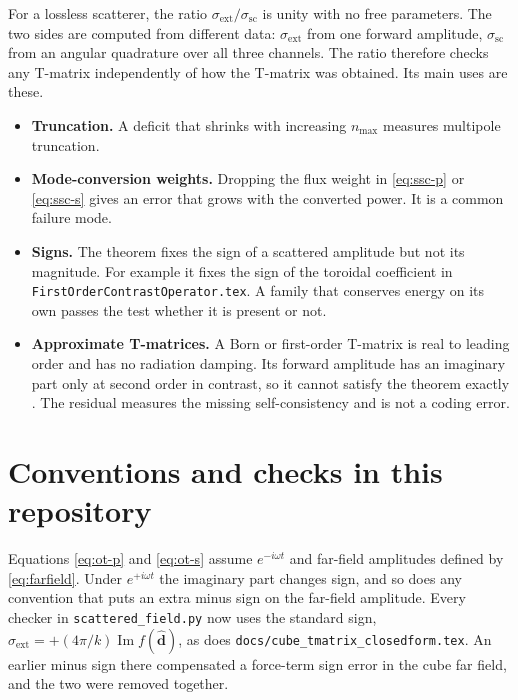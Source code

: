 \documentclass[11pt,a4paper]{article}
\newcommand{\bd}{\hat{\mathbf{d}}}
\newcommand{\sext}{\sigma_{\mathrm{ext}}}
\newcommand{\ssc}{\sigma_{\mathrm{sc}}}
\DeclareMathOperator{\Imag}{Im}
\begin{document}
For a lossless scatterer, the ratio $\sext/\ssc$ is unity with no free
parameters. The two sides are computed from different data: $\sext$
from one forward amplitude, $\ssc$ from an angular quadrature over all
three channels. The ratio therefore checks any T-matrix independently
of how the T-matrix was obtained. Its main uses are these.
\begin{itemize}
\item \textbf{Truncation.} A deficit that shrinks with increasing
  $n_{\max}$ measures multipole truncation.
\item \textbf{Mode-conversion weights.} Dropping the flux weight in
  \eqref{eq:ssc-p} or \eqref{eq:ssc-s} gives an error that grows with
  the converted power. It is a common failure mode.
\item \textbf{Signs.} The theorem fixes the sign of a scattered
  amplitude but not its magnitude. For example it fixes the sign of the
  toroidal coefficient in \texttt{FirstOrderContrastOperator.tex}.
  A family that conserves energy on its own passes the test whether it
  is present or not.
\item \textbf{Approximate T-matrices.} A Born or first-order T-matrix
  is real to leading order and has no radiation damping. Its forward
  amplitude has an imaginary part only at second order in contrast, so
  it cannot satisfy the theorem exactly
  \citep{GubernatisDomanyKrumhansl1977}. The residual measures the
  missing self-consistency and is not a coding error.
\end{itemize}

\section{Conventions and checks in this repository}
\label{sec:sign}

Equations \eqref{eq:ot-p} and \eqref{eq:ot-s} assume $e^{-i\omega t}$
and far-field amplitudes defined by \eqref{eq:farfield}. Under
$e^{+i\omega t}$ the imaginary part changes sign, and so does any
convention that puts an extra minus sign on the far-field amplitude. Every
checker in \texttt{scattered\_field.py} now uses the standard sign,
$\sext = +(4\pi/k)\Imag f(\bd)$, as does
\texttt{docs/cube\_tmatrix\_closedform.tex}. An earlier minus sign there
compensated a force-term sign error in the cube far field, and the two
were removed together.
\end{document}
